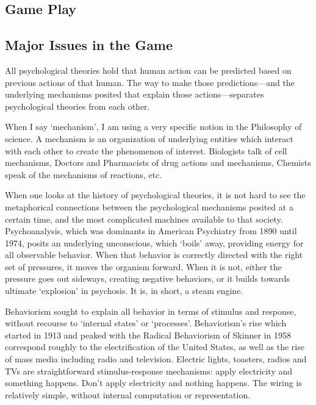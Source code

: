 \begin{refsection}
\pagebreak 

\chapter{Game Play}
\label{gameplay}

\section{Major Issues in the Game}
\label{majorissuesinthegame}

All psychological theories hold that human action can be predicted based on previous actions of that human. The way to make those predictions---and the underlying mechanisms posited that explain those actions---separates psychological theories from each other.

When I say `mechanism', I am using a very specific notion in the Philosophy of science. A mechanism is an organization of underlying entities which interact with each other to create the phenomenon of interest. Biologists talk of cell mechanisms, Doctors and Pharmacists of drug actions and mechanisms, Chemists speak of the mechanisms of reactions, etc. 

When one looks at the history of psychological theories, it is not hard to see the metaphorical connections between the psychological mechanisms posited at a certain time, and the most complicated machines available to that society. Psychoanalysis, which was dominants in American Psychiatry from 1890 until 1974, posits an underlying unconscious, which `boils' away, providing energy for all observable behavior. When that behavior is correctly directed with the right set of pressures, it moves the organism forward. When it is not, either the pressure goes out sideways, creating negative behaviors, or it builds towards ultimate `explosion' in psychosis. It is, in short, a steam engine.

Behaviorism sought to explain all behavior in terms of stimulus and response, without recourse to `internal states' or `processes'. Behaviorism's rise which started in 1913 and peaked with the Radical Behaviorism of Skinner in 1958 correspond roughly to the electrification of the United States, as well as the rise of mass media including radio and television. Electric lights, toasters, radios and TVs are straightforward stimulus-response mechanisms: apply electricity and something happens. Don't apply electricity and nothing happens. The wiring is relatively simple, without internal computation or representation. 


\end{refsection}
